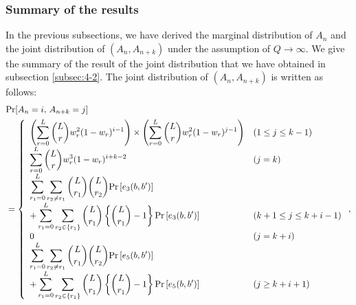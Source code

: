 \documentclass[dvipdfmx,english]{ampmt} %
\begin{document}
\subsubsection{Summary of the results}
In the previous subsections, we have derived the marginal distribution of $A_n$ and the joint distribution of $(A_n,A_{n+k})$ under the assumption of $Q\to\infty$. 
We give the summary of the result of the joint distribution that we have obtained in subsection \ref{subsec:4-2}.
The joint distribution of $(A_n,A_{n+k})$ is written as follows:
\begin{align}\begin{split}\label{eq:joint_distribution}
  &\mathrm{Pr}[A_n=i,\,A_{n+k}=j] \\
  &= \left\{ \begin{array}{ll}
  \displaystyle\left( \sum_{r=0}^{L} \binom{L}{r}w_r^2 (1-w_r)^{i-1} \right) \times \left( \sum_{r=0}^{L} \binom{L}{r}w_r^2 (1-w_r)^{j-1} \right) & (1\leq j \leq k-1)\\
  \displaystyle\sum_{r=0}^{L} \dbinom{L}{r} w_{r}^3 (1-w_{r})^{i+k-2} & (j=k) \\
  \displaystyle\sum_{r_1=0}^{L} \sum_{r_2 \neq r_1} \dbinom{L}{r_1} \dbinom{L}{r_2} \mathrm{Pr} \left[e_3(b,b^\prime) \right] \\
  + \displaystyle\sum_{r_1=0}^{L}\sum_{r_2\in\{r_1\}} \dbinom{L}{r_1} \left\{ \dbinom{L}{r_1} -1 \right\} \mathrm{Pr} \left[e_3(b,b^\prime) \right] & (k+1 \leq j \leq k+i-1)\\
  0 & (j=k+i) \\
  \displaystyle\sum_{r_1=0}^{L} \sum_{r_2 \neq r_1} \dbinom{L}{r_1} \dbinom{L}{r_2} \mathrm{Pr} \left[e_5(b,b^\prime) \right] \\
  \displaystyle+ \sum_{r_1=0}^{L}\sum_{r_2\in\{r_1\}} \dbinom{L}{r_1} \left\{ \dbinom{L}{r_1} -1 \right\} \mathrm{Pr} \left[e_5(b,b^\prime) \right] & (j \geq k+i+1)
  \end{array}\right.,
\end{split}\end{align}
\end{document}
